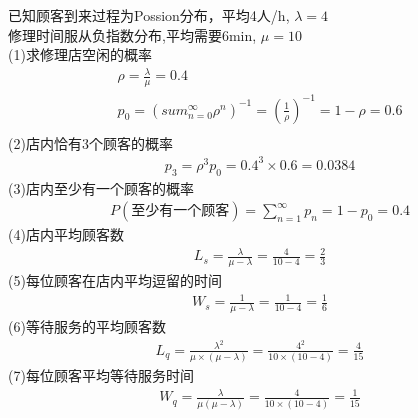 \documentclass{article}
\begin{document}
    已知顾客到来过程为Possion分布，平均4人/h, $\lambda = 4$\\
    修理时间服从负指数分布,平均需要6min, $\mu = 10$\\
    (1)求修理店空闲的概率\\
    \begin{gather*}
        \rho = \frac{\lambda}{\mu} = 0.4\\
        p_0 = \left(sum_{n=0}^\infty \rho^n\right)^{-1} 
    = \left(\frac{1}{\rho}\right)^{-1}
    = 1-\rho = 0.6\\
    \end{gather*}
    (2)店内恰有3个顾客的概率\\
    \begin{gather*}
        p_3 = \rho^3 p_0 = 0.4^3 \times 0.6 = 0.0384
    \end{gather*}
    (3)店内至少有一个顾客的概率\\
    \begin{gather*}
        P(\text{至少有一个顾客})= \sum_{n=1}^{\infty} p_n = 1- p_0 = 0.4
    \end{gather*}
    (4)店内平均顾客数\\
    \begin{gather*}
        L_s = \frac{\lambda}{\mu - \lambda}
    = \frac{4}{10 - 4} = \frac{2}{3} 
    \end{gather*}
    (5)每位顾客在店内平均逗留的时间\\
    \begin{gather*}
        W_s = \frac{1}{\mu - \lambda}
    = \frac{1}{10 - 4} = \frac{1}{6}
    \end{gather*}
    (6)等待服务的平均顾客数\\
    \begin{gather*}
        L_q = \frac{\lambda ^2}{\mu \times (\mu - \lambda)}
    = \frac{4^2}{10 \times (10 - 4)}
    = \frac{4}{15}
    \end{gather*}
    (7)每位顾客平均等待服务时间\\
    \begin{gather*}
        W_q = \frac{\lambda}{\mu(\mu - \lambda)}
    = \frac{4}{10 \times (10 - 4)} = \frac{1}{15}
    \end{gather*}
\end{document}
